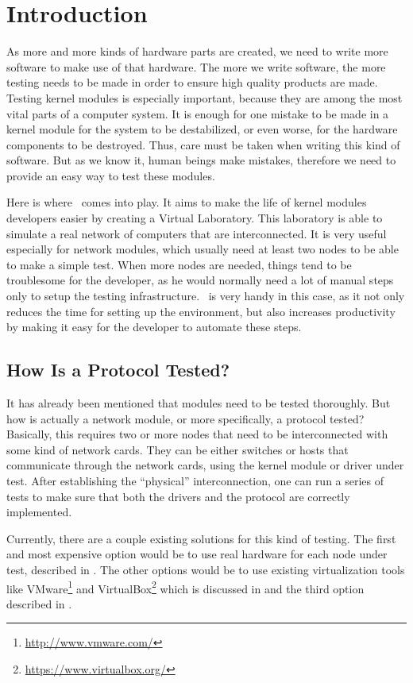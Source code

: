 \chapter{Introduction}
\label{chapter:intro}

As more and more kinds of hardware parts are created, we need to write more software to make use of that hardware.
The more we write software, the more testing needs to be made in order to ensure high quality products are made.
Testing kernel modules is especially important, because they are among the most vital parts of a computer system.
It is enough for one mistake to be made in a kernel module for the system to be
destabilized, or even worse, for the hardware components to be destroyed.
Thus, care must be taken when writing this kind of software.
But as we know it, human beings make mistakes, therefore we need to provide an easy way to test these modules.

Here is where \project\ comes into play.
It aims to make the life of kernel modules developers easier by creating a Virtual Laboratory.
This laboratory is able to simulate a real network of computers that are interconnected.
It is very useful especially for network modules, which usually need at least two nodes to be able to make a simple test.
When more nodes are needed, things tend to be troublesome for the developer, as he would normally need a lot of manual steps only to setup the testing infrastructure.
\project\ is very handy in this case, as it not only reduces the time for setting up the environment, but also increases productivity by making it easy for the developer to automate these steps.

\section{How Is a Protocol Tested?}
\label{sec:proto-testing}

It has already been mentioned that modules need to be tested thoroughly. But how is actually a network module, or more specifically, a protocol tested?
Basically, this requires two or more nodes that need to be interconnected with some kind of network cards.
They can be either switches or hosts that communicate through the network cards, using the kernel module or driver under test.
After establishing the ``physical'' interconnection, one can run a series of tests to make sure that both the drivers and the protocol are correctly implemented.

Currently, there are a couple existing solutions for this kind of testing.
The first and most expensive option would be to use real hardware for each node under test, described in .
The other options would be to use existing virtualization tools like VMware\footnote{\url{http://www.vmware.com/}} and VirtualBox\footnote{\url{https://www.virtualbox.org/}} which is discussed in  and the third option described in .

